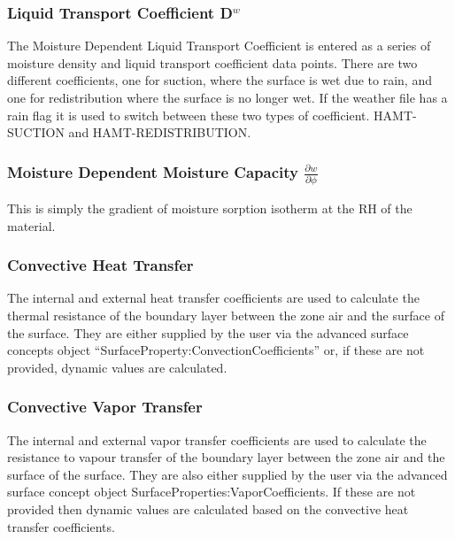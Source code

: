 \subsubsection{Liquid Transport Coefficient D\(^{w}\)}\label{liquid-transport-coefficient-dw}

The Moisture Dependent Liquid Transport Coefficient is entered as a series of moisture density and liquid transport coefficient data points. There are two different coefficients, one for suction, where the surface is wet due to rain, and one for redistribution where the surface is no longer wet. If the weather file has a rain flag it is used to switch between these two types of coefficient. HAMT-SUCTION and HAMT-REDISTRIBUTION.

\subsubsection{Moisture Dependent Moisture Capacity \(\frac{\partial w}{\partial \phi}\)}\label{moisture-dependent-moisture-capacity-fracpartial-wpartial-phi}

This is simply the gradient of moisture sorption isotherm at the RH of the material.

\subsubsection{Convective Heat Transfer}\label{convective-heat-transfer}

The internal and external heat transfer coefficients are used to calculate the thermal resistance of the boundary layer between the zone air and the surface of the surface. They are either supplied by the user via the advanced surface concepts object ``SurfaceProperty:ConvectionCoefficients'' or, if these are not provided, dynamic values are calculated.

\subsubsection{Convective Vapor Transfer}\label{convective-vapor-transfer}

The internal and external vapor transfer coefficients are used to calculate the resistance to vapour transfer of the boundary layer between the zone air and the surface of the surface. They are also either supplied by the user via the advanced surface concept object SurfaceProperties:VaporCoefficients. If these are not provided then dynamic values are calculated based on the convective heat transfer coefficients.

